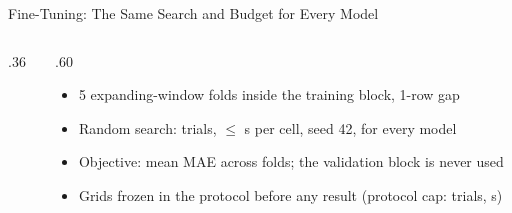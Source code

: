 \documentclass[aspectratio=169,11pt]{beamer}
\newcommand{\currentspeaker}{}
\newcommand{\speaker}[1]{\gdef\currentspeaker{#1}}
\newcommand{\repourl}{https://github.com/Steven-ZYC/INT4096-ML-Financial-Forecasting}
\newcommand{\currentrepolink}{}
\newcommand{\repolink}[2]{\gdef\currentrepolink{%
  \href{\repourl/#1/main/#2}{\color{accent}GitHub: \texttt{\detokenize{#2}}}}}
\begin{document}
\begin{frame}{Fine-Tuning: The Same Search and Budget for Every Model}
  \repolink{blob}{src/int4096/experiments/tuning.py}
  \speaker{Zhang Yancheng}
  \begin{columns}[T,onlytextwidth]
    \begin{column}{.36\textwidth}
      \centering
    \end{column}
    \begin{column}{.60\textwidth}
      \scriptsize
      \begin{itemize}\setlength{\itemsep}{0pt}
        \item 5 expanding-window folds inside the training block, 1-row gap
        \item Random search: \TrialsUsed{} trials, $\le$\SecondsUsed{} s per cell, seed 42, for every model
        \item Objective: mean MAE across folds; the validation block is never used
        \item Grids frozen in the protocol before any result (protocol cap: \TrialsMax{} trials, \SecondsMax{} s)
      \end{itemize}
    \end{column}
  \end{columns}
  \par\vspace{2mm}
  \centering\tiny
  \setlength{\tabcolsep}{4pt}
  \renewcommand{\arraystretch}{1.1}
  
\end{frame}
\end{document}
